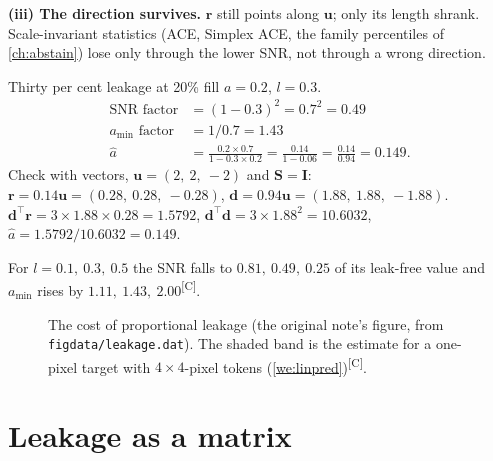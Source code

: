 \documentclass[11pt,a4paper,oneside,openany]{book}
\newcommand{\B}[1]{{\symbf{#1}}}
\newcommand{\B}[1]{{\bm{#1}}}
\newcommand{\comp}{\textsuperscript{\textsf{\scriptsize[C]}}}
\newcommand{\T}{^{\top}}
\newcommand{\vr}{\B{r}}
\newcommand{\vd}{\B{d}}
\newcommand{\vu}{\B{u}}
\newcommand{\mS}{\B{S}}
\newcommand{\mI}{\B{I}}
\newcommand{\ahat}{\hat a}
\begin{document}
\textbf{(iii) The direction survives.} $\vr$ still points along $\vu$; only its length shrank. Scale-invariant statistics (ACE, Simplex ACE, the family
percentiles of \cref{ch:abstain}) lose only through the lower SNR, not through a wrong direction.

\begin{worked}[label=we:leak]{Thirty per cent leakage at 20\% fill}
$a=0.2$, $l=0.3$.
\begin{align*}
\text{SNR factor} &= (1-0.3)^2=0.7^2=0.49\\
a_{\min}\text{ factor} &= 1/0.7=1.43\\
\ahat &= \frac{0.2\times0.7}{1-0.3\times0.2}=\frac{0.14}{1-0.06}=\frac{0.14}{0.94}=0.149 .
\end{align*}
Check with vectors, $\vu=(2,\ 2,\ -2)$ and $\mS=\mI$: $\vr=0.14\vu=(0.28,\ 0.28,\ -0.28)$, $\vd=0.94\vu=(1.88,\ 1.88,\ -1.88)$.
$\vd\T\vr=3\times1.88\times0.28=1.5792$, $\vd\T\vd=3\times1.88^2=10.6032$, $\ahat=1.5792/10.6032=0.149$.
\end{worked}

For $l=0.1,\ 0.3,\ 0.5$ the SNR falls to $0.81,\ 0.49,\ 0.25$ of its leak-free value and $a_{\min}$ rises by $1.11,\ 1.43,\ 2.00$\comp.

\begin{figure}[ht]
\centering
{}
\caption{The cost of proportional leakage (the original note's figure, from \texttt{figdata/leakage.dat}). The shaded band is the estimate for a one-pixel
target with $4\times4$-pixel tokens (\cref{we:linpred})\comp.}
\label{fig:leak}
\end{figure}

\section{Leakage as a matrix}
\end{document}
